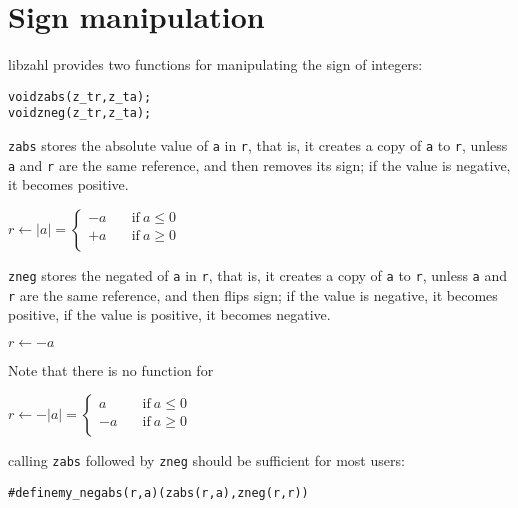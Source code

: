 \newpage
\section{Sign manipulation}
\label{sec:Sign manipulation}

libzahl provides two functions for manipulating
the sign of integers:

\begin{alltt}
   void zabs(z_t r, z_t a);
   void zneg(z_t r, z_t a);
\end{alltt}

{\tt zabs} stores the absolute value of {\tt a}
in {\tt r}, that is, it creates a copy of
{\tt a} to {\tt r}, unless {\tt a} and {\tt r}
are the same reference, and then removes its sign;
if the value is negative, it becomes positive.

\vspace{1em}
\(
    r \gets \lvert a \rvert =
    \left \lbrace \begin{array}{rl}
        -a & \quad \textrm{if}~a \le 0 \\
        +a & \quad \textrm{if}~a \ge 0 \\
    \end{array} \right .
\)
\vspace{1em}

{\tt zneg} stores the negated of {\tt a}
in {\tt r}, that is, it creates a copy of
{\tt a} to {\tt r}, unless {\tt a} and {\tt r}
are the same reference, and then flips sign;
if the value is negative, it becomes positive,
if the value is positive, it becomes negative.

\vspace{1em}
\(
    r \gets -a
\)
\vspace{1em}

Note that there is no function for

\vspace{1em}
\(
    r \gets -\lvert a \rvert =
    \left \lbrace \begin{array}{rl}
         a & \quad \textrm{if}~a \le 0 \\
        -a & \quad \textrm{if}~a \ge 0 \\
    \end{array} \right .
\)
\vspace{1em}

\noindent
calling {\tt zabs} followed by {\tt zneg}
should be sufficient for most users:

\begin{alltt}
   #define my_negabs(r, a)  (zabs(r, a), zneg(r, r))
\end{alltt}
